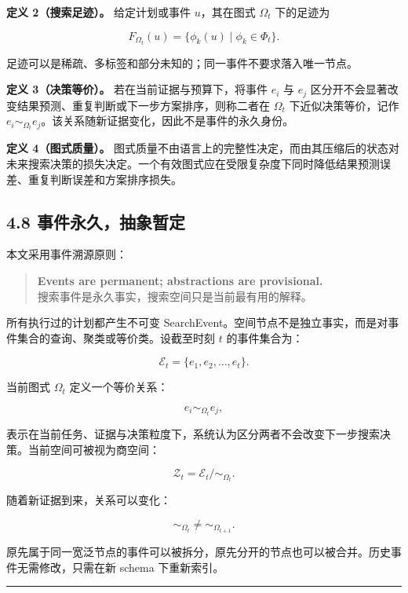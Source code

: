 \documentclass[
  11pt]{ctexart}
\begin{document}
\textbf{定义 2（搜索足迹）。} 给定计划或事件 \(u\)，其在图式
\(\Omega_t\) 下的足迹为

\[
F_{\Omega_t}(u)=\{\phi_k(u)\mid \phi_k\in\Phi_t\}.
\]

足迹可以是稀疏、多标签和部分未知的；同一事件不要求落入唯一节点。

\textbf{定义 3（决策等价）。} 若在当前证据与预算下，将事件 \(e_i\) 与
\(e_j\) 区分开不会显著改变结果预测、重复判断或下一步方案排序，则称二者在
\(\Omega_t\) 下近似决策等价，记作
\(e_i\sim_{\Omega_t}e_j\)。该关系随新证据变化，因此不是事件的永久身份。

\textbf{定义 4（图式质量）。}
图式质量不由语言上的完整性决定，而由其压缩后的状态对未来搜索决策的损失决定。一个有效图式应在受限复杂度下同时降低结果预测误差、重复判断误差和方案排序损失。

\subsection{4.8
事件永久，抽象暂定}\label{ux4e8bux4ef6ux6c38ux4e45ux62bdux8c61ux6682ux5b9a}

本文采用事件溯源原则：

\begin{quote}
\textbf{Events are permanent; abstractions are provisional.}\\
搜索事件是永久事实，搜索空间只是当前最有用的解释。
\end{quote}

所有执行过的计划都产生不可变
SearchEvent。空间节点不是独立事实，而是对事件集合的查询、聚类或等价类。设截至时刻
\(t\) 的事件集合为：

\[
\mathcal{E}_t=\{e_1,e_2,\ldots,e_t\}.
\]

当前图式 \(\Omega_t\) 定义一个等价关系：

\[
e_i \sim_{\Omega_t} e_j,
\]

表示在当前任务、证据与决策粒度下，系统认为区分两者不会改变下一步搜索决策。当前空间可被视为商空间：

\[
\mathcal{Z}_t=\mathcal{E}_t / {\sim_{\Omega_t}}.
\]

随着新证据到来，关系可以变化：

\[
\sim_{\Omega_t} \neq \sim_{\Omega_{t+1}}.
\]

原先属于同一宽泛节点的事件可以被拆分，原先分开的节点也可以被合并。历史事件无需修改，只需在新
schema 下重新索引。

\begin{center}\rule{0.5\linewidth}{0.5pt}\end{center}
\end{document}
